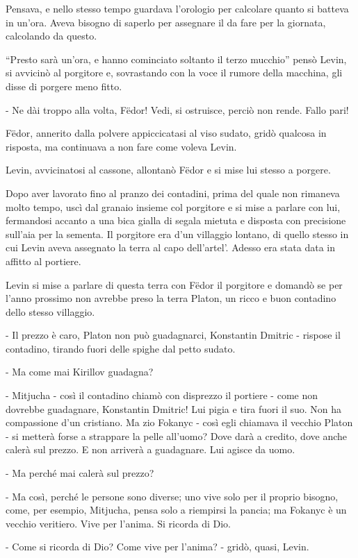 Pensava, e nello stesso tempo guardava l'orologio per calcolare quanto si batteva in un'ora. Aveva bisogno di saperlo per assegnare il da fare per la giornata, calcolando da questo. 

``Presto sarà un'ora, e hanno cominciato soltanto il terzo mucchio'' pensò Levin, si avvicinò al porgitore e, sovrastando con la voce il rumore della macchina, gli disse di porgere meno fitto. 

- Ne dài troppo alla volta, Fëdor! Vedi, si ostruisce, perciò non rende. Fallo pari! 

Fëdor, annerito dalla polvere appiccicatasi al viso sudato, gridò qualcosa in risposta, ma continuava a non fare come voleva Levin. 

Levin, avvicinatosi al cassone, allontanò Fëdor e si mise lui stesso a porgere. 

Dopo aver lavorato fino al pranzo dei contadini, prima del quale non rimaneva molto tempo, uscì dal granaio insieme col porgitore e si mise a parlare con lui, fermandosi accanto a una bica gialla di segala mietuta e disposta con precisione sull'aia per la sementa. Il porgitore era d'un villaggio lontano, di quello stesso in cui Levin aveva assegnato la terra al capo dell'artel'. Adesso era stata data in affitto al portiere. 

Levin si mise a parlare di questa terra con Fëdor il porgitore e domandò se per l'anno prossimo non avrebbe preso la terra Platon, un ricco e buon contadino dello stesso villaggio. 

- Il prezzo è caro, Platon non può guadagnarci, Konstantin Dmitric - rispose il contadino, tirando fuori delle spighe dal petto sudato. 

- Ma come mai Kirillov guadagna? 

- Mitjucha - così il contadino chiamò con disprezzo il portiere - come non dovrebbe guadagnare, Konstantin Dmitric! Lui pigia e tira fuori il suo. Non ha compassione d'un cristiano. Ma zio Fokanyc - così egli chiamava il vecchio Platon - si metterà forse a strappare la pelle all'uomo? Dove darà a credito, dove anche calerà sul prezzo. E non arriverà a guadagnare. Lui agisce da uomo. 

- Ma perché mai calerà sul prezzo? 

- Ma così, perché le persone sono diverse; uno vive solo per il proprio bisogno, come, per esempio, Mitjucha, pensa solo a riempirsi la pancia; ma Fokanyc è un vecchio veritiero. Vive per l'anima. Si ricorda di Dio. 

- Come si ricorda di Dio? Come vive per l'anima? - gridò, quasi, Levin. 

